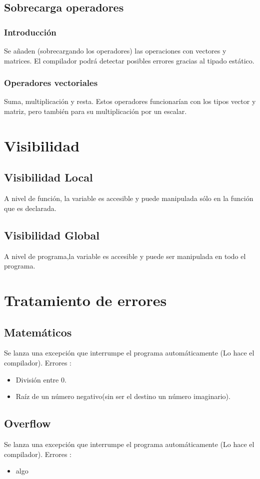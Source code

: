 \documentclass[12pt,a4paper]{article}
\begin{document}
\subsection{Sobrecarga operadores}
\subsubsection{Introducción}
Se añaden (sobrecargando los operadores) las operaciones con vectores y
matrices. El compilador podrá detectar posibles errores gracias al tipado
estático.
\subsubsection{Operadores vectoriales}
Suma, multiplicación y resta. Estos operadores funcionarían con los tipos vector
y matriz, pero también para su multiplicación por un escalar.
\section{Visibilidad}
\subsection{Visibilidad Local}
A nivel de función, la variable es accesible y puede manipulada sólo en la
función que es declarada. 
\subsection{Visibilidad Global}
A nivel de programa,la variable es accesible y puede ser  manipulada en todo el
programa.
\section{Tratamiento de errores}
\subsection{Matemáticos}
Se lanza una excepción que interrumpe el programa automáticamente (Lo hace el
compilador).
Errores :
\begin{itemize}
\item División entre 0.
\item Raíz de un número negativo(sin ser el destino un número imaginario).
\end{itemize}
\subsection{Overflow}
Se lanza una excepción que interrumpe el programa automáticamente (Lo hace el
compilador).
Errores :
\begin{itemize}
\item algo
\end{itemize}
\end{document}

